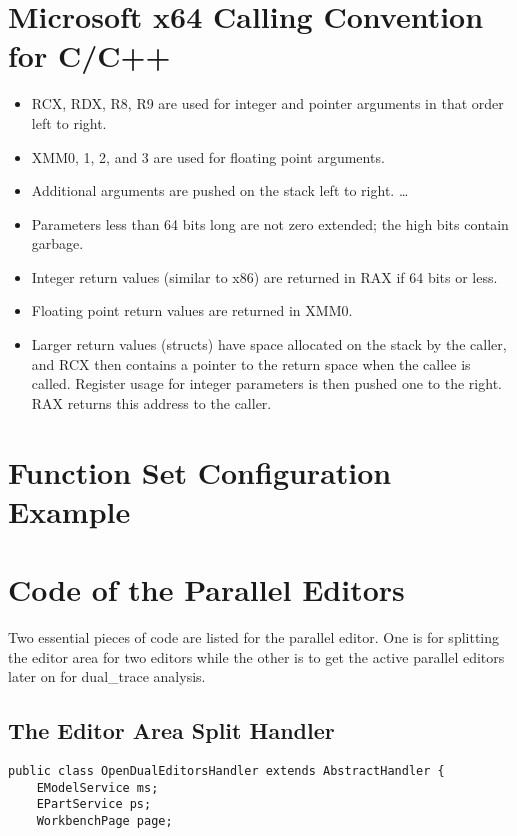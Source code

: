 \begin{appendices}	
\chapter{Microsoft x64 Calling Convention for C/C++}\label{convention}
\begin{itemize}  
\item RCX, RDX, R8, R9 are used for integer and pointer arguments in that order left to right.
\item XMM0, 1, 2, and 3 are used for floating point arguments.
\item Additional arguments are pushed on the stack left to right. \ldots 
\item Parameters less than 64 bits long are not zero extended; the high bits contain garbage.
\item Integer return values (similar to x86) are returned in RAX if 64 bits or less.
\item Floating point return values are returned in XMM0.
\item Larger return values (structs) have space allocated on the stack by the caller, and RCX then contains a pointer to the return space when the callee is called. Register usage for integer parameters is then pushed one to the right. RAX returns this address to the caller.
\end{itemize}

\chapter{Function Set Configuration Example}\label{funcset}


\chapter{Code of the Parallel Editors}\label{paralleleditor}
Two essential pieces of code are listed for the parallel editor. One is for splitting the editor area for two editors while the other is to get the active parallel editors later on  for dual\_trace analysis.
\section{The Editor Area Split Handler}
\begin{lstlisting}[caption= code in OpenDualEditorsHandler.java]
public class OpenDualEditorsHandler extends AbstractHandler {
	EModelService ms;
	EPartService ps;
	WorkbenchPage page;


\end{lstlisting}
\end{appendices}
